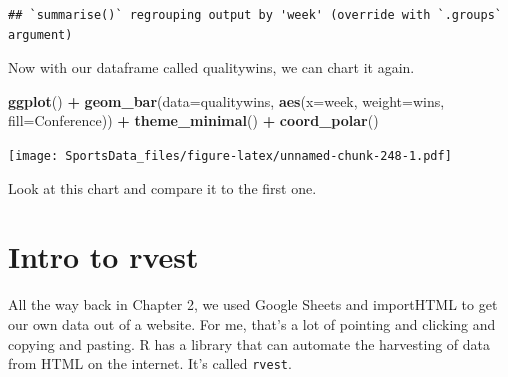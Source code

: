 \documentclass[
]{book}
\newenvironment{Shaded}{\begin{snugshade}}{\end{snugshade}}
\newcommand{\DataTypeTok}[1]{\textcolor[rgb]{0.13,0.29,0.53}{#1}}
\newcommand{\FloatTok}[1]{\textcolor[rgb]{0.00,0.00,0.81}{#1}}
\newcommand{\KeywordTok}[1]{\textcolor[rgb]{0.13,0.29,0.53}{\textbf{#1}}}
\newcommand{\NormalTok}[1]{#1}
\newcommand{\OperatorTok}[1]{\textcolor[rgb]{0.81,0.36,0.00}{\textbf{#1}}}
\newcommand{\StringTok}[1]{\textcolor[rgb]{0.31,0.60,0.02}{#1}}
\begin{document}
\begin{Shaded}
\end{Shaded}

\begin{verbatim}
## `summarise()` regrouping output by 'week' (override with `.groups` argument)
\end{verbatim}

Now with our dataframe called qualitywins, we can chart it again.

\begin{Shaded}
\begin{Highlighting}[]
\KeywordTok{ggplot}\NormalTok{() }\OperatorTok{+}\StringTok{ }\KeywordTok{geom_bar}\NormalTok{(}\DataTypeTok{data=}\NormalTok{qualitywins, }\KeywordTok{aes}\NormalTok{(}\DataTypeTok{x=}\NormalTok{week, }\DataTypeTok{weight=}\NormalTok{wins, }\DataTypeTok{fill=}\NormalTok{Conference)) }\OperatorTok{+}\StringTok{ }\KeywordTok{theme_minimal}\NormalTok{() }\OperatorTok{+}\StringTok{ }\KeywordTok{coord_polar}\NormalTok{()}
\end{Highlighting}
\end{Shaded}

\texttt{[image: SportsData\_files/figure-latex/unnamed-chunk-248-1.pdf]}

Look at this chart and compare it to the first one.

\hypertarget{intro-to-rvest}{%
\chapter{Intro to rvest}\label{intro-to-rvest}}

All the way back in Chapter 2, we used Google Sheets and importHTML to get our own data out of a website. For me, that's a lot of pointing and clicking and copying and pasting. R has a library that can automate the harvesting of data from HTML on the internet. It's called \texttt{rvest}.
\end{document}
